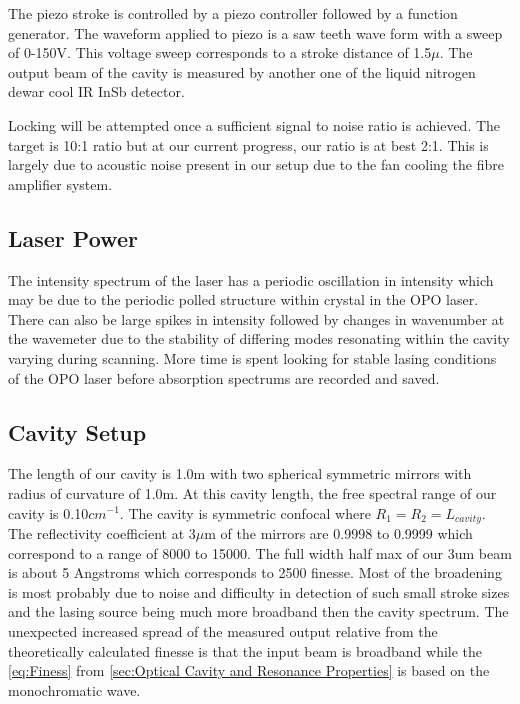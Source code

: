 \documentclass[11pt,a4paper]{book}
\begin{document}
		The piezo stroke is controlled by a piezo controller followed by a function generator. The waveform applied to piezo is a saw teeth wave form with a sweep of 0-150V. This voltage sweep corresponds to a stroke distance of 1.5$\mu$. The output beam of the cavity is measured by another one of the liquid nitrogen dewar cool IR InSb detector. 
		
		Locking will be attempted once a sufficient signal to noise ratio is achieved. The target is 10:1 ratio but at our current progress, our ratio is at best 2:1. This is largely due to acoustic noise present in our setup due to the fan cooling the fibre amplifier system.

		\subsection{Laser Power}
			\label{subsection:Laser Power}
			The intensity spectrum of the laser has a periodic oscillation in intensity which may be due to the periodic polled structure within crystal in the OPO laser. There can also be large spikes in intensity followed by changes in wavenumber at the wavemeter due to the stability of differing modes resonating within the cavity varying during scanning. More time is spent looking for stable lasing conditions of the OPO laser before absorption spectrums are recorded and saved.
			
		\subsection{Cavity Setup}
			\label{subsection:Cavity Setup}
			The length of our cavity is 1.0m with two spherical symmetric mirrors with radius of curvature of 1.0m. At this cavity length, the free spectral range of our cavity is 0.10$cm^{-1}$. The cavity is symmetric confocal where $R_1=R_2=L_{cavity}$. The reflectivity coefficient at 3$\mu$m of the mirrors are 0.9998 to 0.9999 which correspond to a range of 8000 to 15000. The full width half max of our 3um beam is about 5 Angstroms which corresponds to 2500 finesse. Most of the broadening is most probably due to noise and difficulty in detection of such small stroke sizes and the lasing source being much more broadband then the cavity spectrum. The unexpected increased spread of the measured output relative from the theoretically calculated finesse is that the input beam is broadband while the \autoref{eq:Finess} from \autoref{sec:Optical Cavity and Resonance Properties} is based on the monochromatic wave.
\end{document}
